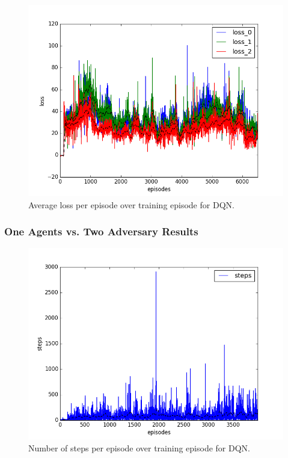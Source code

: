 \begin{figure}[h]
  \centering
  \includegraphics[trim=10 10 10 10,clip,width=\figscale\linewidth]
  {../results/dqn_1vs2/loss.png}
  \caption{Average loss per episode over training episode for DQN.}
  \label{fig:dqn-1vs2}
\end{figure}
\FloatBarrier


\subsubsection{One Agents vs. Two Adversary Results}
\label{sec:experiment:dqn:2vs1}


\begin{figure}[h]
  \centering
  \includegraphics[trim=10 10 10 10,clip,width=\figscale\linewidth]
  {../results/dqn_2vs1/steps.png}
  \caption{Number of steps per episode over training episode for DQN.}
  \label{fig:dqn-2vs1}
\end{figure}
\FloatBarrier



